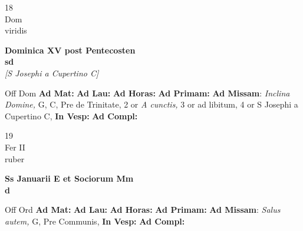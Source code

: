\documentclass[10pt, openany]{book}
\begin{document}
    \begin{center}
        \begin{minipage}{3.5in}
            \vspace{2em}
            \begin{minipage}{0.5in}
                {\Huge 18} \\
                {\normalsize Dom} \\
                {\normalsize viridis}
            \end{minipage}
            \begin{minipage}{3.0in}
                \textbf{ \large Dominica XV post Pentecosten \\
                \textnormal{\normalsize sd}} \\ \textit{[S Josephi a Cupertino C]} \\ 
            \end{minipage}
            \begin{justify}Off Dom
                \textbf{Ad Mat: }
                \textbf{Ad Lau: }
                \textbf{Ad Horas: }
                \textbf{Ad Primam: }\textbf{Ad Missam}: \textit{Inclina Domine,} G, C, Pre de Trinitate, 2 or \textit{A cunctis,} 3 or ad libitum, 4 or S Josephi a Cupertino C,  
                \textbf{In Vesp: }
                \textbf{Ad Compl: }
            \end{justify}
        \end{minipage}
    \end{center}

    \begin{center}
        \begin{minipage}{3.5in}
            \vspace{2em}
            \begin{minipage}{0.5in}
                {\Huge 19} \\
                {\normalsize Fer II} \\
                {\normalsize ruber}
            \end{minipage}
            \begin{minipage}{3.0in}
                \textbf{ \large Ss Januarii E et Sociorum Mm \\
                \textnormal{\normalsize d}} \\ 
            \end{minipage}
            \begin{justify}Off Ord
                \textbf{Ad Mat: }
                \textbf{Ad Lau: }
                \textbf{Ad Horas: }
                \textbf{Ad Primam: }\textbf{Ad Missam}: \textit{Salus autem,} G, Pre Communis,  
                \textbf{In Vesp: }
                \textbf{Ad Compl: }
            \end{justify}
        \end{minipage}
    \end{center}
\end{document}
